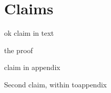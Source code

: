 \documentclass{article}
\makeatletter
\newenvironment{claimproof}[1][\proofname]{
  \pushQED{\qed}%
  \normalfont
  \trivlist
  \item[\hskip\labelsep
        \color{black}\sffamily
    #1{.}]\ignorespaces
}{%
  \renewcommand\qedsymbol{\textcolor{black}{\ensuremath{\vartriangleleft}}}
  \popQED\endtrivlist%
  \renewcommand\qedsymbol{\textcolor{black}{\ensuremath{\blacktriangleleft}}}
}
\makeatother
\begin{document}
\section{Claims}

\begin{claimrep}
    ok claim in text
\end{claimrep}
\begin{claimproof}
    the proof
\end{claimproof}

\begin{toappendix}

\begin{claim}
    claim in appendix
\end{claim}
\begin{claimproof}
     Second claim, within toappendix
\end{claimproof}

\end{toappendix}
\end{document}
